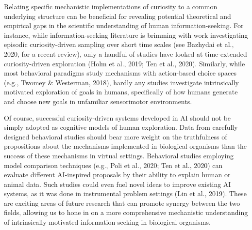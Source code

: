 Relating specific mechanistic implementations of curiosity to a common underlying structure can be beneficial for revealing potential theoretical and empirical gaps in the scientific understanding of human information-seeking. For instance, while information-seeking literature is brimming with work investigating episodic curiosity-driven sampling over short time scales (see Bazhydai et al., 2020, for a recent review), only a handful of studies have looked at time-extended curiosity-driven exploration (Holm et al., 2019; Ten et al., 2020). Similarly, while most behavioral paradigms study mechanisms with action-based choice spaces (e.g., Twomey \& Westerman, 2018), hardly any studies investigate intrinsically motivated exploration of goals in humans, specifically of how humans generate and choose new goals in unfamiliar sensorimotor environments.

Of course, successful curiosity-driven systems developed in \ac{AI} should not be simply adopted as cognitive models of human exploration. Data from carefully designed behavioral studies should bear more weight on the truthfulness of propositions about the mechanisms implemented in biological organisms than the success of these mechanisms in virtual settings. Behavioral studies employing model comparison techniques (e.g., Poli et al., 2020; Ten et al., 2020) can evaluate different \ac{AI}-inspired proposals by their ability to explain human or animal data. Such studies could even fuel novel ideas to improve existing \ac{AI} systems, as it was done in instrumental problem settings (Lin et al., 2019). These are exciting areas of future research that can promote synergy between the two fields, allowing us to hone in on a more comprehensive mechanistic understanding of intrinsically-motivated information-seeking in biological organisms.
    
